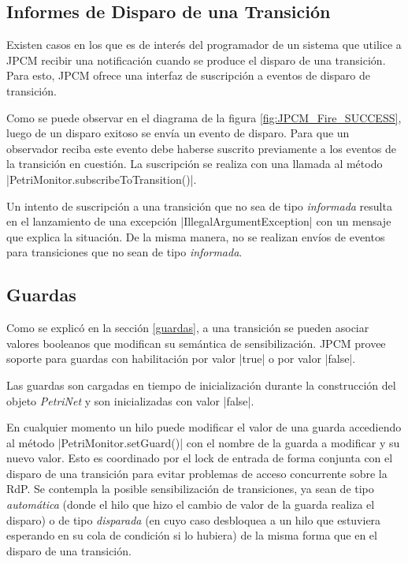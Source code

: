 \subsection{Informes de Disparo de una Transición}

Existen casos en los que es de interés del programador de un sistema que
utilice a JPCM recibir una notificación cuando se produce el disparo de una
transición. Para esto, JPCM ofrece una interfaz de suscripción a eventos de
disparo de transición.

Como se puede observar en el diagrama de la figura \ref{fig:JPCM_Fire_SUCCESS},
luego de un disparo exitoso se envía un evento de disparo. Para que un
observador reciba este evento debe haberse suscrito previamente a los eventos de
la transición en cuestión. La suscripción se realiza con una llamada al método
|PetriMonitor.subscribeToTransition()|.

Un intento de suscripción a una transición que no sea de tipo \textit{informada}
resulta en el lanzamiento de una excepción |IllegalArgumentException|
con un mensaje que explica la situación. De la misma manera, no se realizan
envíos de eventos para transiciones que no sean de tipo \textit{informada}.

\subsection{Guardas}

Como se explicó en la sección \ref{guardas}, a una transición se pueden asociar
valores booleanos que modifican su semántica de sensibilización. JPCM provee
soporte para guardas con habilitación por valor |true| o por valor
|false|.

Las guardas son cargadas en tiempo de inicialización durante la construcción
del objeto \textit{PetriNet} y son inicializadas con valor |false|.

En cualquier momento un hilo puede modificar el valor de una guarda accediendo
al método |PetriMonitor.setGuard()| con el nombre de la guarda a
modificar y su nuevo valor. Esto es coordinado por el lock de entrada de forma
conjunta con el disparo de una transición para evitar problemas de acceso
concurrente sobre la RdP. Se contempla la posible sensibilización de
transiciones, ya sean de tipo \textit{automática} (donde el hilo que hizo el
cambio de valor de la guarda realiza el disparo) o de tipo \textit{disparada}
(en cuyo caso desbloquea a un hilo que estuviera esperando en su cola de
condición si lo hubiera) de la misma forma que en el disparo de una transición.
